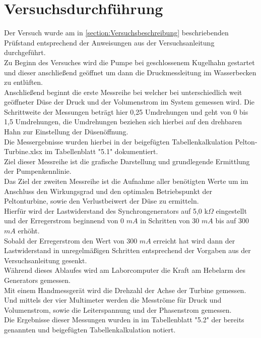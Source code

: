 \section{Versuchsdurchführung}
Der Versuch wurde am in \autoref{section:Versuchsbeschreibung} beschriebenden Prüfstand entsprechend der Anweisungen aus der Versuchsanleitung \cite[S.11-14]{Anleitung} durchgeführt.\\
Zu Beginn des Versuches wird die Pumpe bei geschlossenem Kugelhahn gestartet und dieser anschließend geöffnet um dann die Druckmessleitung im Wasserbecken zu entlüften.\\
Anschließend beginnt die erste Messreihe bei welcher bei unterschiedlich weit geöffneter Düse der Druck und der Volumenstrom im System gemessen wird.
Die Schrittweite der Messungen beträgt hier 0,25 Umdrehungen und geht von 0 bis 1,5 Umdrehungen, die Umdrehungen beziehen sich hierbei auf den drehbaren Hahn zur Einstellung der Düsenöffnung.\\
Die Messergebnisse wurden hierbei in der beigefügten Tabellenkalkulation Pelton-Turbine.xlsx im Tabellenblatt "5.1" dokumentiert.\\
Ziel dieser Messreihe ist die grafische Darstellung und grundlegende Ermittlung der Pumpenkennlinie.\\
\newline
Das Ziel der zweiten Messreihe ist die Aufnahme aller benötigten Werte um im Anschluss den Wirkungsgrad und den optimalen Betriebspunkt der Peltonturbine,
 sowie den Verlustbeiwert der Düse zu ermitteln.\\
 Hierfür wird der Lastwiderstand des Synchrongenerators auf 5,0 k$\Omega$ eingestellt und der Erregerstrom beginnend von 0 $mA$ in Schritten von 30 $mA$ bis auf 300 $mA$ erhöht.\\
 Sobald der Erregerstrom den Wert von 300 $mA$ erreicht hat wird dann der Lastwiderstand in unregelmäßigen Schritten entsprechend der Vorgaben aus der Versuchsanleitung \cite[S.12]{Anleitung} gesenkt.\\
 Während dieses Ablaufes wird am Laborcomputer die Kraft am Hebelarm des Generators gemessen.\\
 Mit einem Handmessgerät wird die Drehzahl der Achse der Turbine gemessen.\\
 Und mittels der vier Multimeter werden die Mesströme für Druck und Volumenstrom, sowie die Leiterspannung und der Phasenstrom gemessen.\\
 Die Ergebnisse dieser Messungen wurden in im Tabellenblatt "5.2" der bereits genannten und beigefügten Tabellenkalkulation notiert.\\
